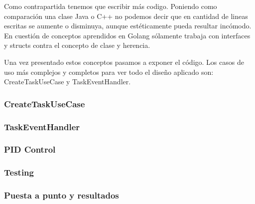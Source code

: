 Como contrapartida tenemos que escribir más codigo. Poniendo como comparación una clase Java o C++ no podemos decir que en cantidad de lineas escritas se aumente o disminuya, aunque estéticamente pueda resultar incómodo. En cuestión de conceptos aprendidos en Golang sólamente trabaja con interfaces y structs contra el concepto de clase y herencia.

Una vez presentado estos conceptos pasamos a exponer el código. Los casos de uso más complejos y completos para ver todo el diseño aplicado son: CreateTaskUseCase y TaskEventHandler.

\subsubsection{CreateTaskUseCase}\label{subsubsec:CreateTaskUseCase}
    
\subsubsection{TaskEventHandler}
    
\subsubsection{PID Control}\label{subsubsec:pidControl}
    
\subsubsection{Testing}
    
\subsubsection{Puesta a punto y resultados}
    


